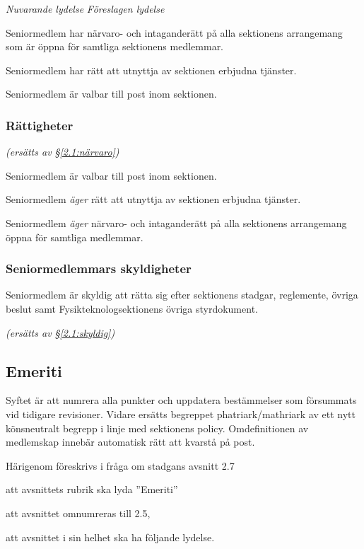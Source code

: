 \documentclass{article}
\newenvironment{lydelse}
    {\begin{paracol}{2}%
        \emph{Nuvarande lydelse}%
        \switchcolumn%
        \emph{Föreslagen lydelse}%
    \end{paracol}%
    \begin{enumerate}[label=\thesubsection.\arabic*]%
    \begin{paracol}{2}%
    }{\end{paracol}\end{enumerate}}
\newcommand{\itemb}{\item[\textbullet]}
\begin{document}
\begin{lydelse}
  \itemb Seniormedlem har närvaro- och intaganderätt på alla
   sektionens arrangemang som är öppna för samtliga sektionens
   medlemmar.

  \itemb Seniormedlem har rätt att utnyttja av sektionen erbjudna
   tjänster.
   
  \itemb Seniormedlem är valbar till post inom sektionen.
    
\switchcolumn
    \subsubsection*{Rättigheter}%
    \emph{(ersätts av \S \ref{2.1:närvaro})}
    
    \item Seniormedlem är valbar till post inom sektionen.
    
    \item Seniormedlem \emph{äger} rätt att utnyttja av sektionen erbjudna
      tjänster.
   
    \item Seniormedlem \emph{äger} närvaro- och intaganderätt på alla sektionens
      arrangemang öppna för samtliga medlemmar.

  \switchcolumn*
    \subsubsection*{Seniormedlemmars skyldigheter}%
    \itemb Seniormedlem är skyldig att rätta sig efter sektionens stadgar,
  regle\-mente, övriga beslut samt  Fysikteknologsektionens övriga styrdokument.
    
  \switchcolumn
    \emph{(ersätts av \S \ref{2.1:skyldig})}
\end{lydelse}

\subsection{Emeriti}
Syftet är att numrera alla punkter och uppdatera bestämmelser som försummats vid
tidigare revisioner.
Vidare ersätts begreppet phatriark/mathriark av ett nytt könsneutralt begrepp i
linje med sektionens policy.
Omdefinitionen av medlemskap innebär automatisk rätt att kvarstå på post.

Härigenom föreskrivs i fråga om stadgans avsnitt 2.7
\begin{dels}
    \item att avsnittets rubrik ska lyda ''Emeriti''
    \item att avsnittet omnumreras till 2.5,
    \item att avsnittet i sin helhet ska ha följande lydelse.
\end{dels}
\end{document}
